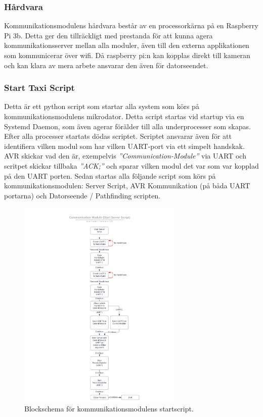 \documentclass[10pt,oneside,swedish]{lips}
\begin{document}
\subsubsection{Hårdvara}
Kommunikationsmodulens hårdvara består av en processorkärna på en Raspberry Pi 3b. Detta ger den tillräckligt med prestanda för att kunna agera kommunikationsserver mellan alla moduler, även till den externa applikationen som kommunicerar över wifi. Då raspberry pi:n kan kopplas direkt till kameran och kan klara av mera arbete ansvarar den även för datorseendet.

\subsubsection{Start Taxi Script}
Detta är ett python script som startar alla system som körs på kommunikationsmodulens mikrodator.
Detta script startas vid startup via en Systemd Daemon, som även agerar förälder till alla underprocesser som skapas.
Efter alla processer startats dödas scriptet.
Scriptet ansvarar även för att identifiera vilken modul som har vilken UART-port via ett simpelt handskak.
AVR skickar vad den är, exempelvis \emph{''Communication-Module''} via UART och scritpet skickar tillbaka \emph{''ACK;''} och sparar vilken modul det var som var kopplad på den UART porten. Sedan startas alla följande script som körs på kommunikationsmodulen: Server Script, AVR Kommunikation (på båda UART portarna) och Datorseende / Pathfinding scripten.

\begin{figure}[htbp]
  \centering
  \includegraphics[width=0.7\textwidth]{./Figures/CM_Start_Server_Script.png}
  \caption{Blockschema för kommunikationsmodulens startscript.}
  \label{fig:CM_Start_Server_Script.png}
\end{figure}
\end{document}
